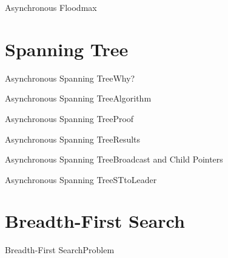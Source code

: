 \documentclass[pdf]{beamer}
\begin{document}
\begin{frame}{Asynchronous Floodmax}
    
\end{frame}

\section{Spanning Tree}
\begin{frame}{Asynchronous Spanning Tree}{Why?}
	
\end{frame}

\begin{frame}{Asynchronous Spanning Tree}{Algorithm}

\end{frame}

\begin{frame}{Asynchronous Spanning Tree}{Proof}
	
	
\end{frame}
\begin{frame}{Asynchronous Spanning Tree}{Results}
	
	
\end{frame}

\begin{frame}{Asynchronous Spanning Tree}{Broadcast and Child Pointers}
	
	
\end{frame}

\begin{frame}{Asynchronous Spanning Tree}{STtoLeader}
	
	
\end{frame}

\section{Breadth-First Search}
\begin{frame}{Breadth-First Search}{Problem}
	
	
\end{frame}
\end{document}
